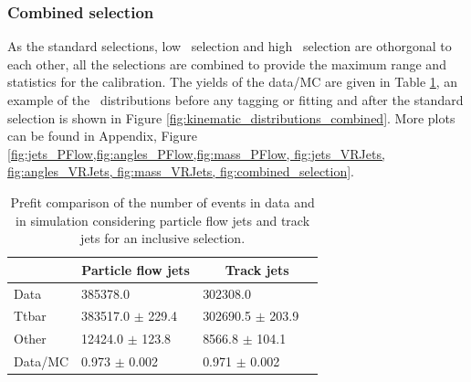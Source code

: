 \documentclass[letterpaper,12pt]{article}
\begin{document}
\subsubsection{Combined selection}
\label{combined_selection}
As the standard selections, low \pt\ selection and high \pt\ selection are othorgonal 
to each other, all the selections are combined to provide the maximum range 
and statistics for the calibration. 
The yields of the data/MC are given in Table \ref{tab:yields_combined}, 
an example of the \pt\ distributions before any tagging or fitting and 
after the standard selection is shown in Figure \ref{fig:kinematic_distributions_combined}. More plots 
can be found in Appendix, Figure \ref{fig:jets_PFlow,fig:angles_PFlow,fig:mass_PFlow,
fig:jets_VRJets, fig:angles_VRJets, fig:mass_VRJets, fig:combined_selection}.
\begin{table}[!b]
	\centering
	\small
	\setlength\tabcolsep{5pt} 
	\begin{tabular}{|l | ll | ll |}
	\hline
	& \multicolumn{2}{c|}{Particle flow jets} & \multicolumn{2}{c|}{Track jets} \\
	\hline
	Data          &    385378.0                  &        &   302308.0              &     \\  
	Ttbar         &    383517.0 $\pm$      229.4 &        &   302690.5 $\pm$      203.9 &   \\
	Other         &     12424.0 $\pm$      123.8 &        &     8566.8 $\pm$      104.1 &   \\
	Data/MC       &    0.973 $\pm$ 0.002         &        &  0.971 $\pm$ 0.002  &           \\
	\hline
	\end{tabular}
	\vspace{0.2cm}
	\caption{Prefit comparison of the  number of events in data and in 
	simulation considering particle flow jets and track jets for an inclusive
	selection.}
	\label{tab:yields_combined}
	\end{table}
\end{document}
